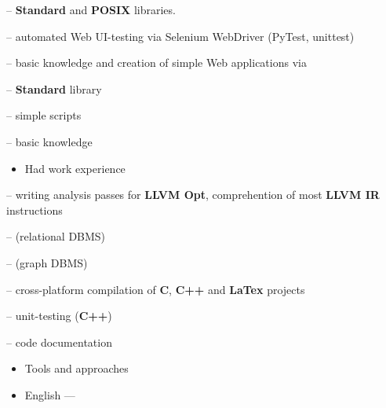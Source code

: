 \documentclass[10pt,a4paper,ragged2e,withhyper]{custom-altacv}
\begin{document}
\begin{paracol}{2}
 -- \textbf{Standard} and \textbf{POSIX} libraries.
\vspace{1ex}

 -- automated Web UI-testing via Selenium WebDriver (PyTest, unittest)
\vspace{1ex}

 -- basic knowledge and creation of simple Web applications via 

 -- \textbf{Standard} library
\vspace{1ex}

 -- simple scripts
\vspace{1ex}

 -- basic knowledge
\vspace{.5ex}

\divider

\begin{itemize}
	\item \textcolor{emphasis}{Had work experience} 
\end{itemize}

 -- writing analysis passes for \textbf{LLVM Opt}, comprehention of most \textbf{LLVM IR} instructions
\vspace{1ex}

 --  (relational DBMS)
\vspace{-.2ex}

 --  (graph DBMS)
\vspace{1ex}

 -- cross-platform compilation of \textbf{C}, \textbf{C++} and \textbf{LaTex} projects
\vspace{1ex}

 -- unit-testing (\textbf{C++})
\vspace{1ex}

 -- code documentation
\vspace{1ex}

\vspace{1ex}

\divider

\begin{itemize}
	\item\textcolor{emphasis}{Tools and approaches}
\end{itemize}





\begin{itemize}
	\item English --- 
\end{itemize}

\end{paracol}
\end{document}

